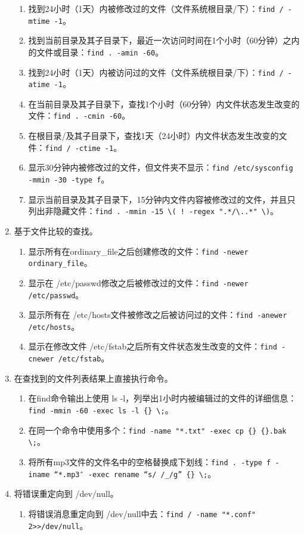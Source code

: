 \begin{enumerate}
\begin{enumerate}
      \item 找到24小时（1天）内被修改过的文件（文件系统根目录/下）：\verb|find / -mtime -1|。
      \item 找到当前目录及其子目录下，最近一次访问时间在1个小时（60分钟）之内的文件或目录：\verb|find . -amin -60|。
      \item 找到24小时（1天）内被访问过的文件（文件系统根目录/下）：\verb|find / -atime -1|。
      \item 在当前目录及其子目录下，查找1个小时（60分钟）内文件状态发生改变的文件：\verb|find . -cmin -60|。
      \item 在根目录/及其子目录下，查找1天（24小时）内文件状态发生改变的文件：\verb|find / -ctime -1|。
      \item 显示30分钟内被修改过的文件，但文件夹不显示：\verb|find /etc/sysconfig -mmin -30 -type f|。
      \item 显示当前目录及其子目录下，15分钟内文件内容被修改过的文件，并且只列出非隐藏文件：\verb|find . -mmin -15 \( ! -regex ".*/\..*" \)|。
    \end{enumerate}
  \item 基于文件比较的查找。
    \begin{enumerate}
      \item 显示所有在ordinary\_file之后创建修改的文件：\verb|find -newer ordinary_file|。
      \item 显示在 /etc/passwd修改之后被修改过的文件：\verb|find -newer /etc/passwd|。
      \item 显示所有在 /etc/hosts文件被修改之后被访问过的文件：\verb|find -anewer /etc/hosts|。
      \item 显示在修改文件 /etc/fstab之后所有文件状态发生改变的文件：\verb|find -cnewer /etc/fstab|。
    \end{enumerate}
  \item 在查找到的文件列表结果上直接执行命令。
    \begin{enumerate}
      \item 在find命令输出上使用 ls -l，列举出1小时内被编辑过的文件的详细信息：\verb|find -mmin -60 -exec ls -l {} \;|。
      \item 在同一个命令中使用多个{}：\verb|find -name "*.txt" -exec cp {} {}.bak \;|。
      \item 将所有mp3文件的文件名中的空格替换成下划线：\verb|find . -type f -iname “*.mp3″ -exec rename “s/ /_/g” {} \;|。
    \end{enumerate}
  \item 将错误重定向到 /dev/null。
    \begin{enumerate}
      \item 将错误消息重定向到 /dev/null中去：\verb|find / -name "*.conf" 2>>/dev/null|。
    \end{enumerate}
\end{enumerate}

